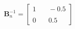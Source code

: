 \documentclass[preview]{standalone}
\begin{document}
\begin{align*}
\mathbf{B}_n^{-1} = \begin{bmatrix} 1 & \quad -0.5 \\ \\0 & \quad 0.5 \end{bmatrix}
\end{align*}
\end{document}
